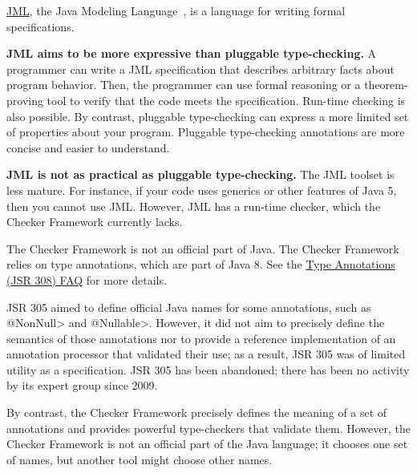 
\href{http://www.eecs.ucf.edu/~leavens/JML//index.shtml}{JML}, the Java Modeling
Language~\cite{LeavensBR2006:JML}, is a language for writing formal
specifications.

\textbf{JML aims to be more expressive than pluggable type-checking.}
A programmer can write a JML specification that
describes arbitrary facts about program behavior.  Then, the programmer can
use formal reasoning or a theorem-proving tool to verify that the code
meets the specification.  Run-time checking is also possible.
By contrast, pluggable type-checking can express a more limited set of
properties about your program.  Pluggable type-checking annotations are
more concise and easier to understand.

\textbf{JML is not as practical as pluggable type-checking.}
The JML toolset is less mature.  For instance, if your code uses
generics or other features of Java 5, then you cannot use JML.
However, JML has a run-time checker, which the Checker Framework currently
lacks.



The Checker Framework is not an official part of Java.
The Checker Framework relies on
type annotations, which are part of Java 8.  See the
\href{https://checkerframework.org/jsr308/jsr308-faq.html#pluggable-type-checking-in-java}{Type
  Annotations (JSR 308) FAQ} for more details.



JSR 305 aimed to define official Java names for some annotations, such as
\<@NonNull> and \<@Nullable>.  However, it did not aim to precisely define
the semantics of those annotations nor to provide a reference
implementation of an annotation processor that validated their use;
as a result, JSR 305 was of limited utility as a specification.
JSR 305 has been abandoned; there has been
no activity by its expert group since
2009.

By contrast, the Checker Framework precisely defines the meaning of a set
of annotations and provides powerful type-checkers that validate them.
However, the Checker Framework is not an official part of the Java
language; it chooses one set of names, but another tool might choose other
names.

